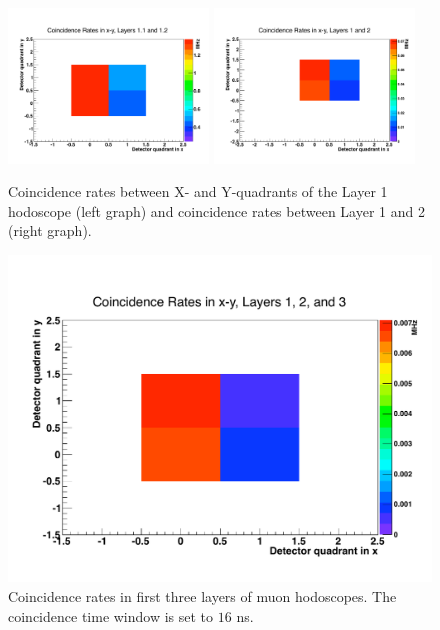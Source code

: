 \begin{figure}[htbp]
\begin{center}
\includegraphics[width=0.475\textwidth]{performance/trigger/muon_coinrate1}
\includegraphics[width=0.475\textwidth]{performance/trigger/muon_coinrate2}
\caption{Coincidence rates between X- and Y-quadrants of the Layer 1 hodoscope (left graph) and coincidence rates between Layer 1 and 2 (right graph). }
\label{fig:c1rates}
\end{center}
\end{figure}

\begin{figure}[htbp]
\begin{center}
\includegraphics[width=\textwidth]{performance/trigger/muon_coinrate3}
\caption{Coincidence rates in first three layers of muon hodoscopes. The coincidence time window is set to $16$ ns. }
\label{fig:c3rates}
\end{center}
\end{figure}





